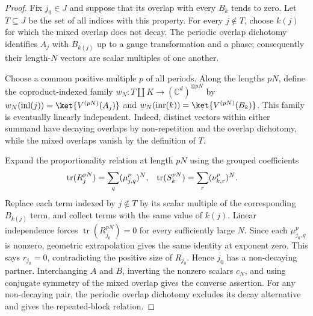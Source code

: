 \begin{proof}\leanok
    Fix $j_0\in J$ and suppose that its overlap with every $B_k$ tends to
    zero. Let $T\subseteq J$ be the set of all indices with this property.
    For every $j\notin T$, choose $k(j)$ for which the mixed overlap does not
    decay. The periodic overlap dichotomy identifies $A_j$ with $B_{k(j)}$
    up to a gauge transformation and a phase; consequently their length-$N$
    vectors are scalar multiples of one another.

    Choose a common positive multiple $p$ of all periods. Along the lengths
    $pN$, define the coproduct-indexed family $w_N\colon T\amalg K\to
        (\mathbb C^d)^{\otimes pN}$ by
    $w_N(\operatorname{inl}(j))=\ket{V^{(pN)}(A_j)}$ and
    $w_N(\operatorname{inr}(k))=\ket{V^{(pN)}(B_k)}$. This family is eventually
    linearly independent. Indeed, distinct vectors within either summand have
    decaying overlaps by non-repetition and the overlap dichotomy, while the
    mixed overlaps vanish by the definition of $T$.

    Expand the proportionality relation at length $pN$ using the grouped
    coefficients
    \begin{align}
        \operatorname{tr}(R_j^{pN}) & =\sum_q(\mu_{j,q}^{p})^N, &
        \operatorname{tr}(S_k^{pN}) & =\sum_r(\nu_{k,r}^{p})^N.
        \notag
    \end{align}
    Replace each term indexed by $j\notin T$ by its scalar multiple of the
    corresponding $B_{k(j)}$ term, and collect terms with the same value of
    $k(j)$. Linear independence forces
    $\operatorname{tr}(R_{j_0}^{pN})=0$ for every sufficiently large $N$.
    Since each $\mu_{j_0,q}^p$ is nonzero, geometric extrapolation gives the
    same identity at exponent zero.  This says $r_{j_0}=0$, contradicting the
    positive size of $R_{j_0}$. Hence $j_0$ has a non-decaying partner.
    Interchanging $A$ and $B$, inverting the nonzero scalars $c_N$, and using
    conjugate symmetry of the mixed overlap gives the converse assertion. For
    any non-decaying pair, the periodic overlap dichotomy excludes its decay
    alternative and gives the repeated-block relation.
\end{proof}

